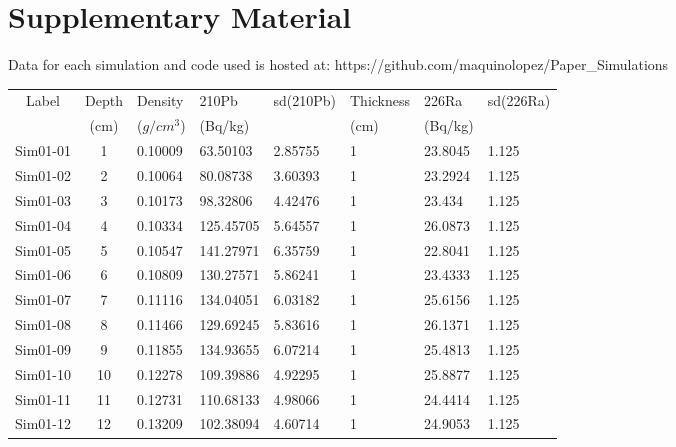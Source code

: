 \documentclass [10pt] {article}
\begin{document}
\section{Supplementary Material}
\label{sec:supp_mat}
Data for each simulation and code used is hosted at: https://github.com/maquinolopez/Paper\_Simulations
\newpage
\begin{table}[H]
	\begin{tabular}{c|cllllll}
		Label    & Depth & Density  & 210Pb & sd(210Pb) & Thickness& 226Ra  & sd(226Ra) \\
		& (cm) &($g/cm^3$) &(Bq/kg)& & (cm) & (Bq/kg)&\\
		\hline 
		Sim01-01 & 1          & 0.10009                         & 63.50103      & 2.85755   & 1              & 23.8045       & 1.125     \\
		Sim01-02 & 2          & 0.10064                         & 80.08738      & 3.60393   & 1              & 23.2924       & 1.125     \\
		Sim01-03 & 3          & 0.10173                         & 98.32806      & 4.42476   & 1              & 23.434        & 1.125     \\
		Sim01-04 & 4          & 0.10334                         & 125.45705     & 5.64557   & 1              & 26.0873       & 1.125     \\
		Sim01-05 & 5          & 0.10547                         & 141.27971     & 6.35759   & 1              & 22.8041       & 1.125     \\
		Sim01-06 & 6          & 0.10809                         & 130.27571     & 5.86241   & 1              & 23.4333       & 1.125     \\
		Sim01-07 & 7          & 0.11116                         & 134.04051     & 6.03182   & 1              & 25.6156       & 1.125     \\
		Sim01-08 & 8          & 0.11466                         & 129.69245     & 5.83616   & 1              & 26.1371       & 1.125     \\
		Sim01-09 & 9          & 0.11855                         & 134.93655     & 6.07214   & 1              & 25.4813       & 1.125     \\
		Sim01-10 & 10         & 0.12278                         & 109.39886     & 4.92295   & 1              & 25.8877       & 1.125     \\
		Sim01-11 & 11         & 0.12731                         & 110.68133     & 4.98066   & 1              & 24.4414       & 1.125     \\
		Sim01-12 & 12         & 0.13209                         & 102.38094     & 4.60714   & 1              & 24.9053       & 1.125     \\

\end{tabular}
\end{table}
\end{document}
